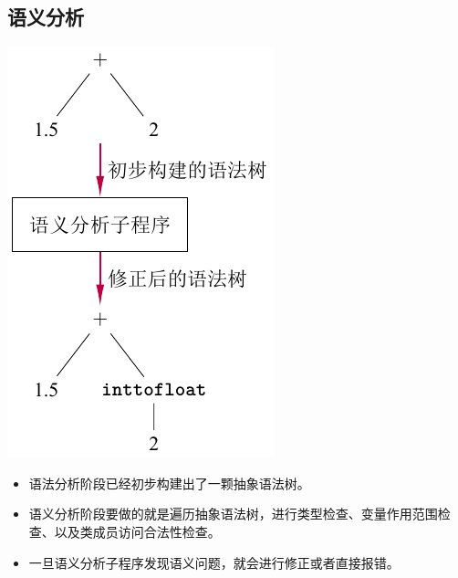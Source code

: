 \documentclass[dvipsnames, svgnames, x11names]{beamer}
\begin{document}
\subsection{语义分析}
\begin{frame}
    \begin{minipage}{.4\linewidth}
    \includegraphics[width=\linewidth]{../figure/semantic.pdf}
    \end{minipage}
    \quad
    \begin{minipage}{.55\linewidth}
    \begin{itemize}[<+->]
        \item 语法分析阶段已经初步构建出了一颗抽象语法树。
        \item 语义分析阶段要做的就是遍历抽象语法树，进行类型检查、变量作用范围检查、以及类成员访问合法性检查。
        \item 一旦语义分析子程序发现语义问题，就会进行修正或者直接报错。
    \end{itemize}
    \end{minipage}
\end{frame}
\end{document}
